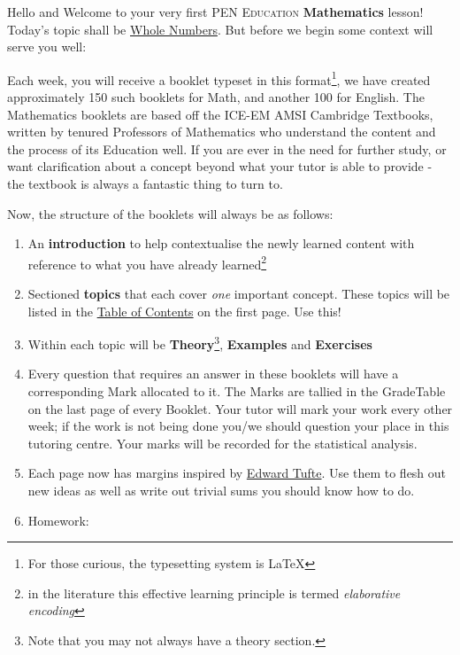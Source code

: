 \begin{student}
Hello and Welcome to your very first \textsc{PEN Education} \textbf{Mathematics} lesson! Today's topic shall be \underline{Whole Numbers}. But before we begin some context will serve you well:

Each week, you will receive a booklet typeset in this format\footnote{For those curious, the typesetting system is \LaTeX}, we have created approximately 150 such booklets for Math, and another 100 for English. The Mathematics booklets are based off the ICE-EM AMSI Cambridge Textbooks, written by tenured Professors of Mathematics who understand the content and the process of its Education well. If you are ever in the need for further study, or want clarification about a concept beyond what your tutor is able to provide - the textbook is always a fantastic thing to turn to.

Now, the structure of the booklets will always be as follows:
\begin{enumerate}
    \item An \textbf{introduction} to help contextualise the newly learned content with reference to what you have already learned\footnote{in the literature this effective learning principle is termed \emph{elaborative encoding}}
    \item Sectioned \textbf{topics} that each cover \emph{one} important concept. These topics will be listed in the \underline{Table of Contents} on the first page. Use this!
    \item Within each topic will be \textbf{Theory}\footnote{Note that you may not always have a theory section.}, \textbf{Examples} and \textbf{Exercises}
    \item Every question that requires an answer in these booklets will have a corresponding Mark allocated to it. The Marks are tallied in the GradeTable on the last page of every Booklet. Your tutor will mark your work every other week; if the work is not being done you/we should question your place in this tutoring centre. Your marks will be recorded for the statistical analysis.
    \item Each page now has margins inspired by \href{https://tug.ctan.org/macros/latex/contrib/tufte-latex/sample-book.pdf}{Edward Tufte}. Use them to flesh out new ideas as well as write out trivial sums you should know how to do.\reversemarginpar{}
    \item Homework:
\end{enumerate}


\end{student}
